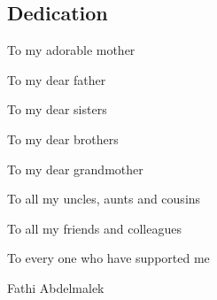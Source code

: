 \newenvironment{dedication}
{
	\thispagestyle{empty}
	\vspace*{\stretch{1}}
	\itshape
	\raggedleft
}
{\par
	\vspace{\stretch{3}}
	\clearpage
}
\begin{center}
	\section*{Dedication}
\end{center}
\begin{dedication}
	To my adorable mother
	
	To my dear father
	
	To my dear sisters
	
	To my dear brothers
	
	To my dear grandmother
	
	To all my uncles, aunts and cousins
	
	To all my friends and colleagues
	
	To every one who have supported me
	\par
	\vspace{2\baselineskip}
	
	\vspace{\baselineskip}
	Fathi Abdelmalek
\end{dedication}